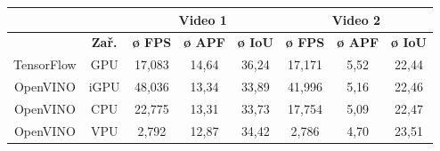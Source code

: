 \begin{table}[H]
  \centering
  \begin{tabular}{cc|ccc|ccc|}
  \cline{3-8}
                                                               &                              & \multicolumn{3}{c|}{\cellcolor[HTML]{CBCEFB}\textbf{Video 1}}                                                                              & \multicolumn{3}{c|}{\cellcolor[HTML]{CBCEFB}\textbf{Video 2}}                                                                              \\ \hline
  \rowcolor[HTML]{E0DBDB} 
  \multicolumn{1}{|c|}{\cellcolor[HTML]{E0DBDB}\textbf{Model}} & \textbf{Zař.}                & \multicolumn{1}{c|}{\cellcolor[HTML]{E0DBDB}\textbf{ø FPS}} & \multicolumn{1}{c|}{\cellcolor[HTML]{E0DBDB}\textbf{ø APF}} & \textbf{ø IoU} & \multicolumn{1}{c|}{\cellcolor[HTML]{E0DBDB}\textbf{ø FPS}} & \multicolumn{1}{c|}{\cellcolor[HTML]{E0DBDB}\textbf{ø APF}} & \textbf{ø IoU} \\ \hline
  \multicolumn{1}{|c|}{\cellcolor[HTML]{E0DBDB}TensorFlow}     & \cellcolor[HTML]{E0DBDB}GPU  & \multicolumn{1}{c|}{17,083}                                 & \multicolumn{1}{c|}{14,64}                                  & 36,24          & \multicolumn{1}{c|}{17,171}                                 & \multicolumn{1}{c|}{5,52}                                   & 22,44          \\ \hline
  \multicolumn{1}{|c|}{\cellcolor[HTML]{E0DBDB}OpenVINO}       & \cellcolor[HTML]{E0DBDB}iGPU & \multicolumn{1}{c|}{48,036}                                 & \multicolumn{1}{c|}{13,34}                                  & 33,89          & \multicolumn{1}{c|}{41,996}                                 & \multicolumn{1}{c|}{5,16}                                   & 22,46          \\ \hline
  \multicolumn{1}{|c|}{\cellcolor[HTML]{E0DBDB}OpenVINO}       & \cellcolor[HTML]{E0DBDB}CPU  & \multicolumn{1}{c|}{22,775}                                 & \multicolumn{1}{c|}{13,31}                                  & 33,73          & \multicolumn{1}{c|}{17,754}                                 & \multicolumn{1}{c|}{5,09}                                   & 22,47          \\ \hline
  \multicolumn{1}{|c|}{\cellcolor[HTML]{E0DBDB}OpenVINO}       & \cellcolor[HTML]{E0DBDB}VPU  & \multicolumn{1}{c|}{2,792}                                  & \multicolumn{1}{c|}{12,87}                                  & 34,42          & \multicolumn{1}{c|}{2,786}                                  & \multicolumn{1}{c|}{4,70}                                   & 23,51          \\ \hline

\end{tabular}
\end{table}

